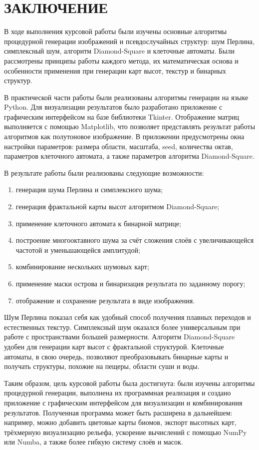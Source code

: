 \chapter*{\large ЗАКЛЮЧЕНИЕ}

В ходе выполнения курсовой работы были изучены основные алгоритмы процедурной генерации изображений и псевдослучайных структур: шум Перлина, симплексный шум, алгоритм Diamond-Square и клеточные автоматы. Были рассмотрены принципы работы каждого метода, их математическая основа и особенности применения при генерации карт высот, текстур и бинарных структур.

В практической части работы были реализованы алгоритмы генерации на языке Python. Для визуализации результатов было разработано приложение с графическим интерфейсом на базе библиотеки Tkinter. Отображение матриц выполняется с помощью Matplotlib, что позволяет представлять результат работы алгоритмов как полутоновое изображение. В приложении предусмотрены окна настройки параметров: размера области, масштаба, seed, количества октав, параметров клеточного автомата, а также параметров алгоритма Diamond-Square.

В результате работы были реализованы следующие возможности:
\begin{enumerate}
    \item генерация шума Перлина и симплексного шума;
    \item генерация фрактальной карты высот алгоритмом Diamond-Square;
    \item применение клеточного автомата к бинарной матрице;
    \item построение многооктавного шума за счёт сложения слоёв с увеличивающейся частотой и уменьшающейся амплитудой;
    \item комбинирование нескольких шумовых карт;
    \item применение маски острова и бинаризация результата по заданному порогу;
    \item отображение и сохранение результата в виде изображения.
\end{enumerate}

Шум Перлина показал себя как удобный способ получения плавных переходов и естественных текстур. Симплексный шум оказался более универсальным при работе с пространствами большей размерности. Алгоритм Diamond-Square удобен для генерации карт высот с фрактальной структурой. Клеточные автоматы, в свою очередь, позволяют преобразовывать бинарные карты и получать структуры, похожие на пещеры, области суши и воды.

Таким образом, цель курсовой работы была достигнута: были изучены алгоритмы процедурной генерации, выполнена их программная реализация и создано приложение с графическим интерфейсом для визуализации и комбинирования результатов. Полученная программа может быть расширена в дальнейшем: например, можно добавить цветовые карты биомов, экспорт высотных карт, трёхмерную визуализацию рельефа, ускорение вычислений с помощью NumPy или Numba, а также более гибкую систему слоёв и масок.
